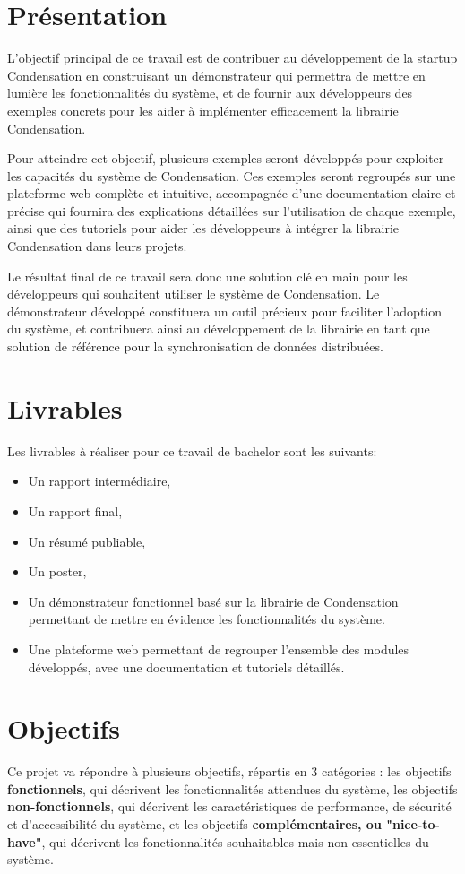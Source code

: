 \section*{Présentation}
L'objectif principal de ce travail est de contribuer au développement de la startup Condensation en construisant un démonstrateur qui permettra de mettre en lumière les fonctionnalités du système, et de fournir aux développeurs des exemples concrets pour les aider à implémenter efficacement la librairie Condensation.

Pour atteindre cet objectif, plusieurs exemples seront développés pour exploiter les capacités du système de Condensation. Ces exemples seront regroupés sur une plateforme web complète et intuitive, accompagnée d'une documentation claire et précise qui fournira des explications détaillées sur l'utilisation de chaque exemple, ainsi que des tutoriels pour aider les développeurs à intégrer la librairie Condensation dans leurs projets.

Le résultat final de ce travail sera donc une solution clé en main pour les développeurs qui souhaitent utiliser le système de Condensation. Le démonstrateur développé constituera un outil précieux pour faciliter l'adoption du système, et contribuera ainsi au développement de la librairie en tant que solution de référence pour la synchronisation de données distribuées.

\section*{Livrables}
Les livrables à réaliser pour ce travail de bachelor sont les suivants:

\begin{itemize}
    \item Un rapport intermédiaire,
    \item Un rapport final,
    \item Un résumé publiable,
    \item Un poster,
    \item Un démonstrateur fonctionnel basé sur la librairie de Condensation permettant de mettre en évidence les fonctionnalités du système.
    \item Une plateforme web permettant de regrouper l'ensemble des modules développés, avec une documentation et tutoriels détaillés.
\end{itemize}

\section*{Objectifs}
Ce projet va répondre à plusieurs objectifs, répartis en 3 catégories : les objectifs \textbf{fonctionnels}, qui décrivent les fonctionnalités attendues du système, les objectifs \textbf{non-fonctionnels}, qui décrivent les caractéristiques de performance, de sécurité et d'accessibilité du système, et les objectifs \textbf{complémentaires, ou "nice-to-have"}, qui décrivent les fonctionnalités souhaitables mais non essentielles du système.

